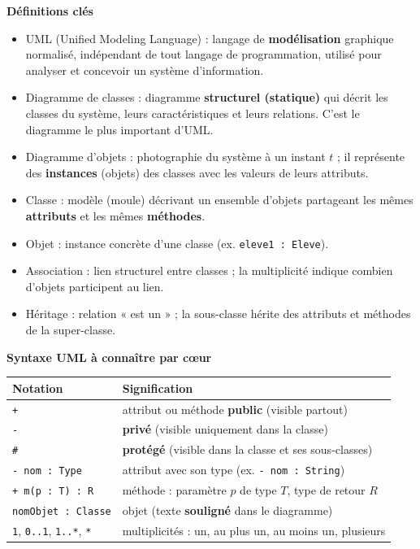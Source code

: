 \documentclass[11pt]{article}
\newcommand{\cle}[1]{{\popxbold\color{popdark}#1}}
\begin{document}
\begin{bilan}
\textbf{Définitions clés}
\begin{itemize}
  \item \cle{UML} (Unified Modeling Language) : langage de \textbf{modélisation} graphique normalisé, indépendant de tout langage de programmation, utilisé pour analyser et concevoir un système d'information.
  \item \cle{Diagramme de classes} : diagramme \textbf{structurel (statique)} qui décrit les classes du système, leurs caractéristiques et leurs relations. C'est le diagramme le plus important d'UML.
  \item \cle{Diagramme d'objets} : photographie du système à un instant $t$ ; il représente des \textbf{instances} (objets) des classes avec les valeurs de leurs attributs.
  \item \cle{Classe} : modèle (moule) décrivant un ensemble d'objets partageant les mêmes \textbf{attributs} et les mêmes \textbf{méthodes}.
  \item \cle{Objet} : instance concrète d'une classe (ex. \texttt{eleve1 : Eleve}).
  \item \cle{Association} : lien structurel entre classes ; la \cle{multiplicité} indique combien d'objets participent au lien.
  \item \cle{Héritage} : relation « est un » ; la sous-classe hérite des attributs et méthodes de la super-classe.
\end{itemize}

\textbf{Syntaxe UML à connaître par cœur}
\begin{center}
\begin{tabularx}{\linewidth}{|l|X|}
\hline
\rowcolor{popblue!40} \textbf{Notation} & \textbf{Signification} \\
\hline
\texttt{+} & attribut ou méthode \textbf{public} (visible partout) \\
\texttt{-} & \textbf{privé} (visible uniquement dans la classe) \\
\texttt{\#} & \textbf{protégé} (visible dans la classe et ses sous-classes) \\
\texttt{- nom : Type} & attribut avec son type (ex. \texttt{- nom : String}) \\
\texttt{+ m(p : T) : R} & méthode : paramètre $p$ de type $T$, type de retour $R$ \\
\texttt{nomObjet : Classe} & objet (texte \textbf{souligné} dans le diagramme) \\
\texttt{1}, \texttt{0..1}, \texttt{1..*}, \texttt{*} & multiplicités : un, au plus un, au moins un, plusieurs \\
\hline
\end{tabularx}
\end{center}


\end{bilan}
\end{document}
